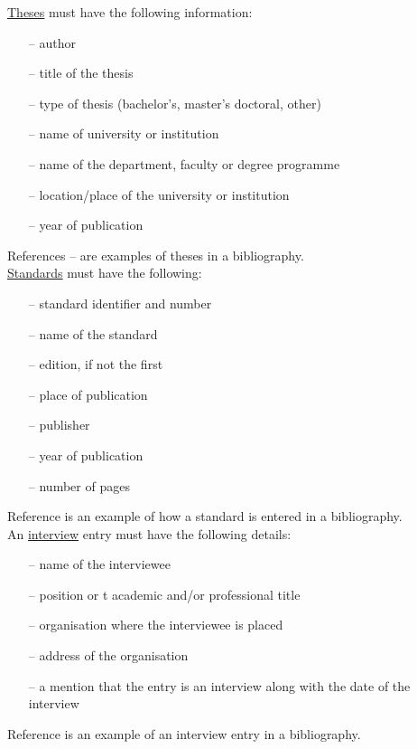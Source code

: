 \documentclass[english, 12pt, a4paper, sci, utf8, a-2b, online]{aaltothesis}
\begin{document}
\noindent
\underline{Theses} must have the following information:
\begin{itemize}
\setlength{\itemsep}{-3pt}
\item[--]author
\item[--]title of the thesis
\item[--]type of thesis (bachelor's, master's doctoral, other)
\item[--]name of university or institution
\item[--]name of the department, faculty or degree programme
\item[--]location/place of the university or institution
\item[--]year of publication
\end{itemize}
References \cite{Miinusmaa}--\cite{Lonnqvist} are examples of theses in a 
bibliography.\\

\noindent
\underline{Standards} must have the following:
\begin{itemize}
\setlength{\itemsep}{-3pt}
\item[--]standard identifier and number
\item[--]name of the standard
\item[--]edition, if not the first
\item[--]place of publication
\item[--]publisher
\item[--]year of publication
\item[--]number of pages
\end{itemize}
Reference \cite{sfs} is an example of how a standard is entered in a 
bibliography.\\

\noindent
An \underline{interview} entry must have the following details:
\begin{itemize}
\setlength{\itemsep}{-3pt}
\item[--]name of the interviewee
\item[--]position or t academic and/or professional title
\item[--]organisation where the interviewee is placed
\item[--]address of the organisation
\item[--]a mention that the entry is an interview along with the date of the 
interview
\end{itemize}
Reference \cite{interview} is an example of an interview entry in a 
bibliography.
\end{document}
